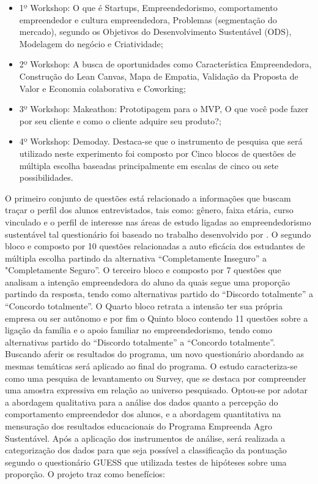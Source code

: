 \begin{itemize}

\item {1º Workshop: O que é Startups, Empreendedorismo, comportamento empreendedor e cultura empreendedora, Problemas (segmentação do mercado), segundo os Objetivos do Desenvolvimento Sustentável (ODS), Modelagem do negócio e Criatividade;}
\item {2º Workshop: A busca de oportunidades como Característica Empreendedora, Construção do Lean Canvas, Mapa de Empatia, Validação da Proposta de Valor e Economia colaborativa e Coworking; }

\item {3º Workshop: Makeathon: Prototipagem para o MVP, O que você pode fazer por seu cliente e como o cliente adquire seu produto?;}
\item {4º Workshop: Demoday. Destaca-se que o instrumento de pesquisa que será utilizado neste experimento foi composto por Cinco blocos de questões de múltipla escolha baseadas principalmente em escalas de cinco ou sete possibilidades.}
\end{itemize}

O  primeiro conjunto de questões está relacionado a informações que buscam traçar o perfil dos alunos entrevistados, tais como: gênero, faixa etária, curso vinculado e o perfil de interesse nas áreas de estudo ligadas ao empreendedorismo sustentável tal questionário foi baseado no trabalho desenvolvido por . O segundo bloco e composto por 10 questões relacionadas a auto eficácia dos estudantes de múltipla escolha partindo da alternativa “Completamente Inseguro” a "Completamente Seguro”. O terceiro bloco e composto por 7 questões que analisam a intenção empreendedora do aluno da quais segue uma proporção partindo da resposta, tendo como alternativas partido do “Discordo totalmente” a “Concordo totalmente”. O Quarto bloco retrata a intensão ter sua própria empresa ou ser autônomo e por fim o Quinto bloco contendo 11 questões sobre a ligação da família e o apoio familiar no empreendedorismo, tendo como alternativas partido do “Discordo totalmente” a “Concordo totalmente”. Buscando aferir os resultados do programa, um novo questionário abordando as mesmas temáticas será aplicado ao final do programa. 
O estudo caracteriza-se como uma pesquisa de levantamento ou Survey, que se destaca por compreender uma amostra expressiva em relação ao universo pesquisado. Optou-se por adotar a abordagem qualitativa para a análise dos dados quanto a percepção do comportamento empreendedor dos alunos, e a abordagem quantitativa na mensuração dos resultados educacionais do Programa Empreenda Agro Sustentável. Após a aplicação dos instrumentos de análise, será realizada a categorização dos dados para que seja possível a classificação da pontuação segundo o questionário GUESS que utilizada testes de hipóteses sobre uma proporção. O projeto traz como benefícios: 

